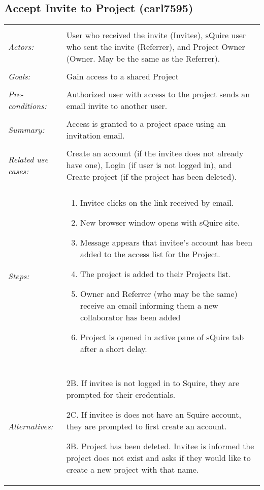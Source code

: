 \subsection{Accept Invite to Project (carl7595)}
\begin{tabular}{ p{2cm} p{12cm} }   
 \hline
 \\
 \textit{Actors:} & User who received the invite (Invitee), sQuire user who sent the invite (Referrer), and Project Owner (Owner. May be the same as the Referrer). \\
 \\
 \textit{Goals:} & Gain access to a shared Project \\
 \\
 \textit{Pre-conditions:} & Authorized user with access to the project sends an email invite to another user. \\
 \\
 \textit{Summary:} & Access is granted to a project space using an invitation email. \\ 
 \\
 \textit{Related use cases:} & Create an account (if the invitee does not already have one), Login (if user is not logged in), and Create project (if the project has been deleted). \\
 \\
 \textit{Steps:} & \begin{enumerate}
  \item Invitee clicks on the link received by email.
	 \item New browser window opens with sQuire site.
	 \item Message appears that invitee's account has been added to the access list for the Project.
	 \item The project is added to their Projects list.
	 \item Owner and Referrer (who may be the same) receive an email informing them a new collaborator has been added
	 \item Project is opened in active pane of sQuire tab after a short delay.
	\end{enumerate} \\
 \\
 \textit{Alternatives:} & 2B. If invitee is not logged in to Squire, they are prompted for their credentials.
 
	2C. If invitee is does not have an Squire account, they are prompted to first create an account.
	
	3B. Project has been deleted. Invitee is informed the project does not exist and asks if they would like to create a new project with that name.
	

\end{tabular}

